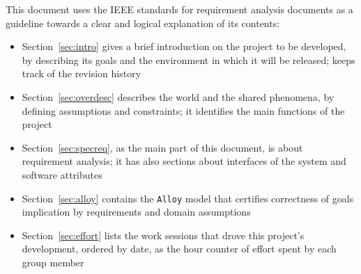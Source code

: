     This document uses the IEEE standards for requirement analysis documents as a guideline towards a clear and logical explanation of its contents:
    \begin{itemize}
      \item Section~\ref{sec:intro} gives a brief introduction on the project to be developed, by describing its goals and the environment in which it will be released; keeps track of the revision history
      \item Section~\ref{sec:overdesc} describes the world and the shared phenomena, by defining assumptions and constraints; it identifies the main functions of the project
      \item Section~\ref{sec:specreq}, as the main part of this document, is about requirement analysis; it has also sections about interfaces of the system and software attributes
      \item Section~\ref{sec:alloy} contains the \texttt{Alloy} model that certifies correctness of goals implication by requirements and domain assumptions
      \item Section~\ref{sec:effort} lists the work sessions that drove this project's development, ordered by date, as the hour counter of effort spent by each group member
    \end{itemize}
